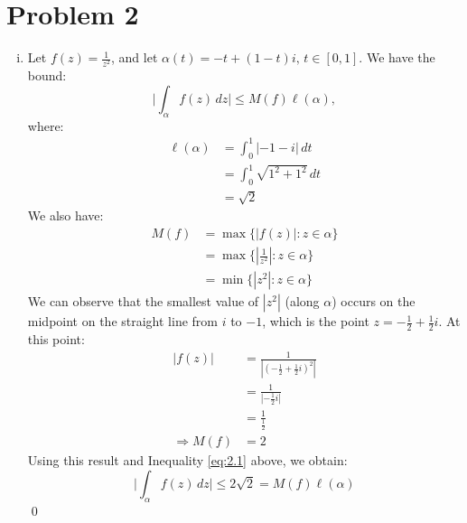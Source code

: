 \documentclass[a4paper, titlepage, DIV=14]{scrartcl}
\begin{document}
    \section*{Problem 2}
    \begin{enumerate}[i)]
        \item Let $f(z) = \frac{1}{z^{2}}$, and let $\alpha(t) = -t + (1-t)i, \, t\in[0,1]$. We have the bound:
        \begin{equation}
            \Big|\int_{\alpha} f(z) \, dz \Big| \leq M(f) \ell(\alpha), \label{eq:2.1}
        \end{equation}
        where:
        \begin{align*}
            \ell(\alpha) &= \int_{0}^{1}|-1-i| \, dt \\
                &= \int_{0}^{1}\sqrt{1^{2}+1^{2}} \, dt \\
                &= \sqrt{2}
        \end{align*}
        We also have:
        \begin{align*}
            M(f) &= \max\{|f(z)| : z\in \alpha\} \\
                &= \max\{|\frac{1}{z^{2}}| : z\in \alpha\} \\
                &= \min\{|z^{2}| : z\in \alpha\} 
        \end{align*}
        We can observe that the smallest value of $|z^{2}|$ (along $\alpha$) occurs on the midpoint on the straight line from $i$ to
        $-1$, which is the point $z = -\frac{1}{2} + \frac{1}{2}i$. At this point:\\
        \begin{align*}
            |f(z)| &= \frac{1}{|(-\frac{1}{2} + \frac{1}{2}i)^{2}|} \\
                &= \frac{1}{|-\frac{1}{2}i|} \\
                &= \frac{1}{\frac{1}{2}} \\
            \Rightarrow   M(f) &= 2
        \end{align*} 
        Using this result and Inequality \eqref{eq:2.1} above, we obtain:
        \begin{equation*}
            \Big|\int_{\alpha} f(z) \, dz \Big| \leq 2\sqrt{2} = M(f)\ell(\alpha)
        \end{equation*} \qed
        

\end{enumerate}
\end{document}
